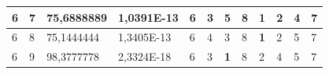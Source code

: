 \documentclass[conference]{IEEEtran}
\begin{document}
\begin{table}[]
\begin{tabular}{|llll|llllllll|}
\multicolumn{1}{|l|}{6}                                                     & \multicolumn{1}{l|}{7}                                                        & \multicolumn{1}{l|}{75,6888889}                                                   & 1,0391E-13                     & \multicolumn{1}{l|}{6}                                                  & \multicolumn{1}{l|}{3}                                                  & \multicolumn{1}{l|}{5}                                                  & \multicolumn{1}{l|}{8}                                                  & \multicolumn{1}{l|}{\textbf{1}}                                         & \multicolumn{1}{l|}{2}                                                  & \multicolumn{1}{l|}{4}                                                  & 7                          \\ \hline
\multicolumn{1}{|l|}{6}                                                     & \multicolumn{1}{l|}{8}                                                        & \multicolumn{1}{l|}{75,1444444}                                                   & 1,3405E-13                     & \multicolumn{1}{l|}{6}                                                  & \multicolumn{1}{l|}{4}                                                  & \multicolumn{1}{l|}{3}                                                  & \multicolumn{1}{l|}{8}                                                  & \multicolumn{1}{l|}{\textbf{1}}                                         & \multicolumn{1}{l|}{2}                                                  & \multicolumn{1}{l|}{5}                                                  & 7                          \\ \hline
\multicolumn{1}{|l|}{6}                                                     & \multicolumn{1}{l|}{9}                                                        & \multicolumn{1}{l|}{98,3777778}                                                   & 2,3324E-18                     & \multicolumn{1}{l|}{6}                                                  & \multicolumn{1}{l|}{3}                                                  & \multicolumn{1}{l|}{\textbf{1}}                                         & \multicolumn{1}{l|}{8}                                                  & \multicolumn{1}{l|}{2}                                                  & \multicolumn{1}{l|}{4}                                                  & \multicolumn{1}{l|}{5}                                                  & 7                          \\ \hline

\end{tabular}
\end{table}
\end{document}
